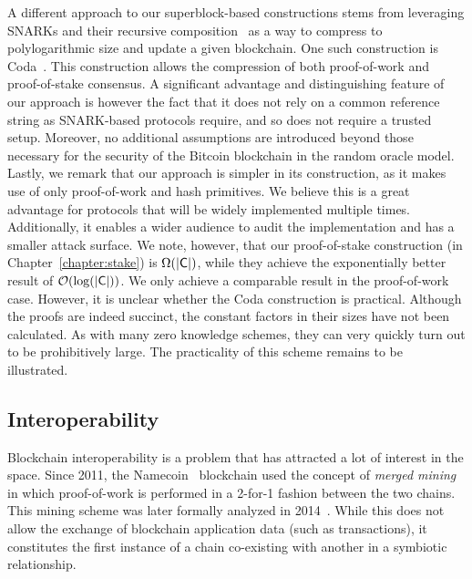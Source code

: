 A different approach to our superblock-based constructions stems from leveraging
SNARKs and their recursive composition~\cite{snarks,recursive-snarks} as a way
to compress to polylogarithmic size and update a given blockchain.
One such construction is Coda~\cite{coda}. This construction allows the
compression of both proof-of-work and proof-of-stake consensus. A significant
advantage and distinguishing feature of our approach is however the fact that it
does not rely on a common reference string as SNARK-based protocols require, and
so does not require a trusted setup. Moreover, no additional assumptions are
introduced beyond those necessary for the security of the Bitcoin blockchain in
the random oracle model. Lastly, we remark that our approach is simpler in its
construction, as it makes use of only proof-of-work and hash primitives. We
believe this is a great advantage for protocols that will be widely implemented
multiple times. Additionally, it enables a wider audience to audit the
implementation and has a smaller attack surface. We note, however, that our
proof-of-stake construction (in Chapter~\ref{chapter:stake}) is
$\Omega(|\mathsf{C}|)$, while they achieve the exponentially better result of
$\mathcal{O}(\log(|\mathsf{C}|))$. We only achieve a comparable result in the
proof-of-work case. However, it is unclear whether the Coda construction is
practical. Although the proofs are indeed succinct, the constant factors in
their sizes have not been calculated. As with many zero knowledge schemes, they
can very quickly turn out to be prohibitively large. The practicality of this
scheme remains to be illustrated.

\subsection{Interoperability}
Blockchain interoperability is a problem that has attracted a lot of interest in
the space. Since 2011, the Namecoin~\cite{namecoin} blockchain used the concept
of \emph{merged mining} in which proof-of-work is performed in a 2-for-1 fashion
between the two chains. This mining scheme was later formally
analyzed in 2014~\cite{backbone}. While this does not allow the exchange of
blockchain application data (such as transactions), it constitutes the first
instance of a chain co-existing with another in a symbiotic relationship.

